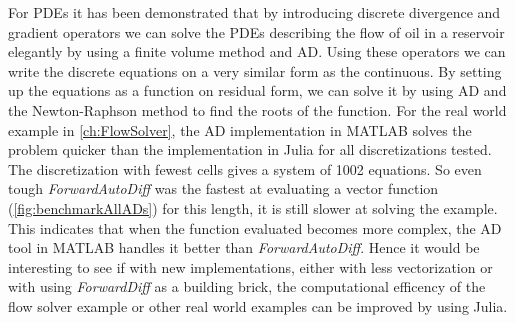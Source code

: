For PDEs it has been demonstrated that by introducing discrete divergence and gradient operators we can solve the PDEs describing the flow of oil in a reservoir elegantly by using a finite volume method and AD. Using these operators we can write the discrete equations on a very similar form as the continuous. By setting up the equations as a function on residual form, we can solve it by using AD and the Newton-Raphson method to find the roots of the function. For the real world example in \autoref{ch:FlowSolver}, the AD implementation in MATLAB solves the problem quicker than the implementation in Julia for all discretizations tested. The discretization with fewest cells gives a system of 1002 equations. So even tough \textit{ForwardAutoDiff} was the fastest at evaluating a vector function (\autoref{fig:benchmarkAllADs}) for this length, it is still slower at solving the example. This indicates that when the function evaluated becomes more complex, the AD tool in MATLAB handles it better than \textit{ForwardAutoDiff}. Hence it would be interesting to see if with new implementations, either with less vectorization or with using \textit{ForwardDiff} as a building brick, the computational efficency of the flow solver example or other real world examples can be improved by using Julia.

